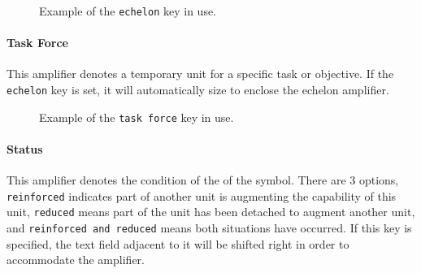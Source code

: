 \documentclass[a4paper, titlepage]{article}
\begin{document}
\begin{figure}[H]
\centering
{}
\caption{Example of the \texttt{echelon} key in use.}
\end{figure}

\paragraph{Task Force}

This amplifier denotes a temporary unit for a specific task or objective. If the \texttt{echelon} key is set, it will automatically size to enclose the echelon amplifier.

 \begin{figure}[H]
\centering
{}
\caption{Example of the \texttt{task force} key in use.}
\end{figure}


\paragraph{Status}

This amplifier denotes the condition of the of the symbol. There are 3 options, \texttt{reinforced} indicates part of another unit is augmenting the capability of this unit, \texttt{reduced} means part of the unit has been detached to augment another unit, and \texttt{reinforced and reduced} means both situations have occurred. If this key is specified, the text field adjacent to it will be shifted right in order to accommodate the amplifier. 
\end{document}
